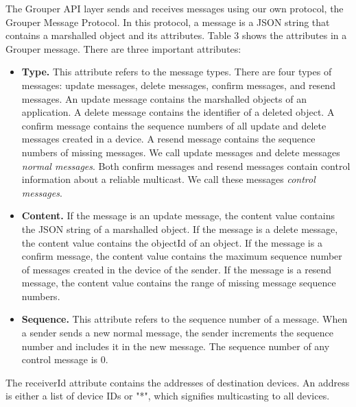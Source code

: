 \documentclass[sigconf]{acmart}
\begin{document}
The Grouper API layer sends and receives messages using our own protocol, the Grouper Message Protocol.
In this protocol, a message is a JSON string that contains a marshalled object and its attributes.
Table 3 shows the attributes in a Grouper message.
There are three important attributes:

\begin{itemize}
	\setlength{\itemsep}{1pt}
	\setlength{\parskip}{0pt}
	\setlength{\parsep}{0pt}
	\item \textbf{Type.}
	This attribute refers to the message types.
	There are four types of messages: update messages, delete messages, confirm messages, and resend messages.
	An update message contains the marshalled objects of an application.
	A delete message contains the identifier of a deleted object.
	A confirm message contains the sequence numbers of all update and delete messages created in a device.
	A resend message contains the sequence numbers of missing messages.
	We call update messages and delete messages \emph{normal messages}. 
	Both confirm messages and resend messages contain control information about a reliable multicast. 
	We call these messages \emph{control messages}.
	\item \textbf{Content.} 
	If the message is an update message, the content value contains the JSON string of a marshalled object.
	If the message is a delete message, the content value contains the objectId of an object.
	If the message is a confirm message, the content value contains the maximum sequence number of messages created in the device of the sender.
	If the message is a resend message, the content value contains the range of missing message sequence numbers.
	\item \textbf{Sequence.}
	This attribute refers to the sequence number of a message.
	When a sender sends a new normal message, the sender increments the sequence number and includes it in the new message.
	The sequence number of any control message is 0.
\end{itemize}

The receiverId attribute contains the addresses of destination devices.
An address is either a list of device IDs or "*", which signifies multicasting to all devices.
\end{document}
